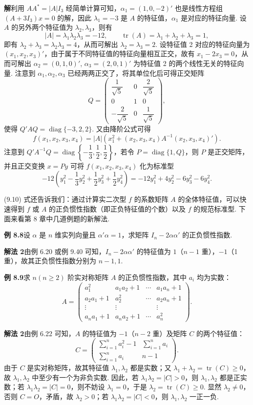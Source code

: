 \documentclass[UTF8,12pt,a4paper,fontset=fandol]{ctexart}
\begin{document}
\noindent\textbf{解}\quad 利用 $AA^*=|A|I_3$ 经简单计算可知，$\alpha_1=(1,0,-2)'$ 也是线性方程组 $(A+3I_3)x=0$ 的解，因此 $\lambda_1=-3$ 是 $A$ 的特征值，$\alpha_1$ 是对应的特征向量. 设 $A$ 的另外两个特征值为 $\lambda_2,\lambda_3$，则有
\[
|A|=\lambda_1\lambda_2\lambda_3=-12,\qquad \operatorname{tr}(A)=\lambda_1+\lambda_2+\lambda_3=1,
\]
即有 $\lambda_2+\lambda_3=\lambda_2\lambda_3=4$，从而可解出 $\lambda_2=\lambda_3=2$. 设特征值 2 对应的特征向量为 $(x_1,x_2,x_3)'$，由于属于不同特征值的特征向量相互正交，故有 $x_1-2x_3=0$，从而可解出 $\alpha_2=(0,1,0)'$, $\alpha_3=(2,0,1)'$ 为特征值 2 的两个线性无关的特征向量. 注意到 $\alpha_1,\alpha_2,\alpha_3$ 已经两两正交了，将其单位化后可得正交矩阵
\[
Q=\begin{pmatrix}
\dfrac1{\sqrt5}&0&\dfrac2{\sqrt5}\\
0&1&0\\
-\dfrac2{\sqrt5}&0&\dfrac1{\sqrt5}
\end{pmatrix},
\]
使得 $Q'AQ=\operatorname{diag}\{-3,2,2\}$. 又由降阶公式可得
\[
f(x_1,x_2,x_3,x_4)=|A|\left(x_1^2+(x_2,x_3,x_4)A^{-1}(x_2,x_3,x_4)'\right).
\]
注意到 $Q'A^{-1}Q=\operatorname{diag}\left\{-\dfrac13,\dfrac12,\dfrac12\right\}$，若令 $P=\operatorname{diag}\{1,Q\}$，则 $P$ 是正交矩阵，并且正交变换 $x=Py$ 可将 $f(x_1,x_2,x_3,x_4)$ 化为标准型
\[
-12\left(y_1^2-\frac13y_2^2+\frac12y_3^2+\frac12y_4^2\right)=-12y_1^2+4y_2^2-6y_3^2-6y_4^2.
\]

(9.10) 式还告诉我们：通过计算实二次型 $f$ 的系数矩阵 $A$ 的全体特征值，可以快速得到 $f$ 或 $A$ 的正负惯性指数（即正负特征值的个数）以及 $f$ 的规范标准型. 下面来看第 8 章中几道例题的新解法.

\noindent\textbf{例 8.8}\quad 设 $\alpha$ 是 $n$ 维实列向量且 $\alpha'\alpha=1$，求矩阵 $I_n-2\alpha\alpha'$ 的正负惯性指数.

\noindent\textbf{解法 2}\quad 由例 6.20 或例 9.40 可知，$I_n-2\alpha\alpha'$ 的特征值为 $1$（$n-1$ 重），$-1$（1 重），故其正负惯性指数分别为 $n-1,1$.

\noindent\textbf{例 8.9}\quad 求 $n(n\ge2)$ 阶实对称矩阵 $A$ 的正负惯性指数，其中 $a_i$ 均为实数：
\[
A=\begin{pmatrix}
a_1^2&a_1a_2+1&\cdots&a_1a_n+1\\
a_2a_1+1&a_2^2&\cdots&a_2a_n+1\\
\vdots&\vdots&&\vdots\\
a_na_1+1&a_na_2+1&\cdots&a_n^2
\end{pmatrix}.
\]

\noindent\textbf{解法 2}\quad 由例 6.22 可知，$A$ 的特征值为 $-1$（$n-2$ 重）及矩阵 $C$ 的两个特征值：
\[
C=\begin{pmatrix}
\displaystyle\sum_{i=1}^na_i^2-1&\displaystyle\sum_{i=1}^na_i\\
\displaystyle\sum_{i=1}^na_i&n-1
\end{pmatrix}.
\]
由于 $C$ 是实对称矩阵，故其特征值 $\lambda_1,\lambda_2$ 都是实数；又 $\lambda_1+\lambda_2=\operatorname{tr}(C)\ge0$，故 $\lambda_1,\lambda_2$ 中至少有一个为非负实数. 因此，若 $\lambda_1\lambda_2=|C|>0$，则 $\lambda_1,\lambda_2$ 都是正实数；若 $\lambda_1\lambda_2=|C|=0$，则不妨设 $\lambda_1=0$，于是 $\lambda_2=\operatorname{tr}(C)\ge0$. 显然 $\lambda_2\ne0$，否则 $C=O$，矛盾，故 $\lambda_2>0$；若 $\lambda_1\lambda_2=|C|<0$，则 $\lambda_1,\lambda_2$ 一正一负.
\end{document}

